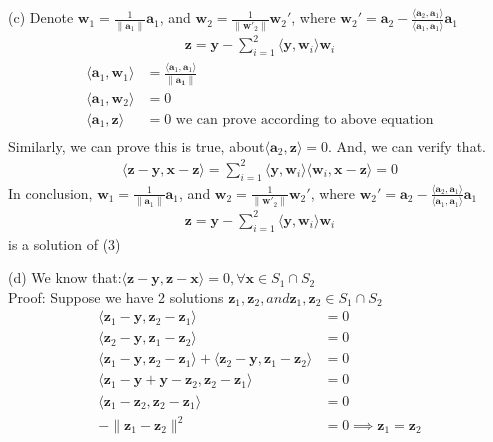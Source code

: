 \documentclass[a4paper,12pt]{article}
\begin{document}
(c)
Denote \(\bm{w}_1 = \frac{1}{\|\bm{a}_1\|} \bm{a}_1\), and \(\bm{w}_2 = \frac{1}{\|\bm{w}'_2\|} \bm{w}_2'\), where \(\bm{w}_2' = \bm{a}_2 - \frac{\langle \bm{a}_2, \bm{a}_1 \rangle}{\langle \bm{a}_1, \bm{a}_1 \rangle} \bm{a}_1\)
\begin{align*}
    \bm{z} = \bm{y} - \sum_{i=1}^{2}\langle \bm{y}, \bm{w}_i  \rangle \bm{w}_i
\end{align*}
\begin{align*}
    \langle \bm{a}_1, \bm{w}_1\rangle &= \frac{\langle \bm{a}_1, \bm{a}_1\rangle}{ \|\bm{a_1}\|} \\
    \langle \bm{a}_1, \bm{w}_2\rangle &= 0 \\
    \langle \bm{a}_1, \bm{z}\rangle &= 0 \text{ we can prove according to above equation}\\
\end{align*}
Similarly, we can prove this is true, about\(\langle\bm{a}_2, \bm{z}\rangle = 0\).
And, we can verify that.
\begin{align*}
    \langle \bm{z} - \bm{y}, \bm{x} - \bm{z}\rangle = \sum_{i=1}^{2}\langle \bm{y}, \bm{w}_i\rangle \langle \bm{w}_i, \bm{x} - \bm{z} \rangle = 0
\end{align*}
In conclusion, \(\bm{w}_1 = \frac{1}{\|\bm{a}_1\|} \bm{a}_1\), and \(\bm{w}_2 = \frac{1}{\|\bm{w}'_2\|} \bm{w}_2'\), where \(\bm{w}_2' = \bm{a}_2 - \frac{\langle \bm{a}_2, \bm{a}_1 \rangle}{\langle \bm{a}_1, \bm{a}_1 \rangle} \bm{a}_1\)
\begin{align*}
    \bm{z} = \bm{y} - \sum_{i=1}^{2}\langle \bm{y}, \bm{w}_i  \rangle \bm{w}_i
\end{align*}
is a solution of (3)



(d)
We know that:\(\langle \bm{z} - \bm{y}, \bm{z} - \bm{x}\rangle = 0 , \forall \bm{x} \in S_1 \cap S_2\) \\
Proof: Suppose we have 2 solutions \(\bm{z}_1, \bm{z}_2, and \bm{z}_1, \bm{z}_2 \in S_1 \cap S_2\)
\begin{align*}
    \langle \bm{z}_1 - \bm{y}, \bm{z}_2 - \bm{z}_1\rangle &= 0  \\
    \langle \bm{z}_2 - \bm{y}, \bm{z}_1 - \bm{z}_2\rangle &= 0  \\
    \langle \bm{z}_1 - \bm{y}, \bm{z}_2 - \bm{z}_1\rangle + \langle \bm{z}_2 - \bm{y}, \bm{z}_1 - \bm{z}_2\rangle &= 0 \\
    \langle \bm{z}_1 - \bm{y} + \bm{y} - \bm{z}_2, \bm{z}_2 - \bm{z}_1\rangle &= 0 \\
    \langle \bm{z}_1 - \bm{z}_2, \bm{z}_2 - \bm{z}_1\rangle &= 0 \\
    -\|\bm{z}_1 - \bm{z}_2\|^2 &= 0 \implies \bm{z}_1 = \bm{z}_2\\
\end{align*}
\end{document}
